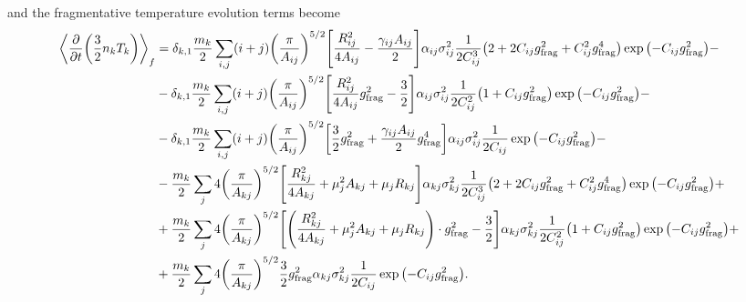 \documentclass[aps,prl,preprint,groupedaddress,10pt]{revtex4-2}
\begin{document}
and the fragmentative temperature evolution terms become
\begin{equation}
    \begin{split}
        \avg{\pdv{t}\pqty{\frac{3}{2}n_kT_k}}_f&=\delta_{k,1}\frac{m_k}{2}
        \sum_{i,j}(i+j)\pqty{\frac{\pi}{A_{ij}}}^{5/2}
        \bqty{\frac{R_{ij}^2}{4A_{ij}}-\frac{\gamma_{ij}A_{ij}}{2}}
        \alpha_{ij}\sigma_{ij}^2\frac{1}{2C_{ij}^3}\pqty{2+2C_{ij}\ltx{g}{frag}^2+C_{ij}^2
        \ltx{g}{frag}^4}\exp\pqty{-C_{ij}\ltx{g}{frag}^2}-\\
        &-\delta_{k,1}\frac{m_k}{2}
        \sum_{i,j}(i+j)\pqty{\frac{\pi}{A_{ij}}}^{5/2}
        \bqty{\frac{R_{ij}^2}{4A_{ij}}\ltx{g}{frag}^2-\frac{3}{2}}
        \alpha_{ij}\sigma_{ij}^2\frac{1}{2C_{ij}^2}\pqty{1+C_{ij}\ltx{g}{frag}^2}
        \exp\pqty{-C_{ij}\ltx{g}{frag}^2}-\\
        &-\delta_{k,1}\frac{m_k}{2}
        \sum_{i,j}(i+j)\pqty{\frac{\pi}{A_{ij}}}^{5/2}
        \bqty{\frac{3}{2}\ltx{g}{frag}^2+\frac{\gamma_{ij}A_{ij}}{2}\ltx{g}{frag}^4}
        \alpha_{ij}\sigma_{ij}^2\frac{1}{2C_{ij}}\exp\pqty{-C_{ij}\ltx{g}{frag}^2}-\\
        &-\frac{m_k}{2}\sum_{j}4\pqty{\frac{\pi}{A_{kj}}}^{5/2}
        \bqty{\frac{R_{kj}^2}{4A_{kj}}+\mu_j^2A_{kj}+\mu_jR_{kj}}
        \alpha_{kj}\sigma_{kj}^2
        \frac{1}{2C_{ij}^3}\pqty{2+2C_{ij}\ltx{g}{frag}^2+C_{ij}^2\ltx{g}{frag}^4}
        \exp\pqty{-C_{ij}\ltx{g}{frag}^2}+\\
        &+\frac{m_k}{2}\sum_{j}4\pqty{\frac{\pi}{A_{kj}}}^{5/2}
        \bqty{\pqty{\frac{R_{kj}^2}{4A_{kj}}+\mu_j^2A_{kj}+\mu_jR_{kj}}\cdot\ltx{g}{frag}^2
        -\frac{3}{2}}
        \alpha_{kj}\sigma_{kj}^2
        \frac{1}{2C_{ij}^2}\pqty{1+C_{ij}\ltx{g}{frag}^2}\exp\pqty{-C_{ij}\ltx{g}{frag}^2}+\\
        &+\frac{m_k}{2}\sum_{j}4\pqty{\frac{\pi}{A_{kj}}}^{5/2}
        \frac{3}{2}\ltx{g}{frag}^2\alpha_{kj}
        \sigma_{kj}^2\frac{1}{2C_{ij}}\exp\pqty{-C_{ij}\ltx{g}{frag}^2}.
    \end{split}
\end{equation}
\end{document}
